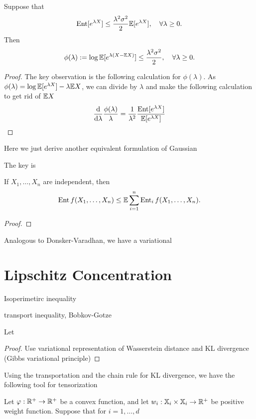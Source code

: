\begin{lemma}[Herbst]
    Suppose that 
    \begin{equation*}
        \operatorname{Ent}[e^{\lambda X}]\leq \frac{\lambda^2\sigma^2}{2}\mathbb{E}[e^{\lambda X}],\quad\forall \lambda\geq 0.
    \end{equation*}
    Then 
    \[\phi(\lambda):=\log \mathbb{E}[e^{\lambda(X-\mathbb{E} X)}]\leq \frac{\lambda^2\sigma^2}{2},\quad\forall \lambda\geq 0.\]
\end{lemma}
\begin{proof}
    The key observation is the following calculation for $\phi(\lambda)$.
    As $\phi(\lambda)=\log \mathbb{E}[e^{\lambda X}]-\lambda \mathbb{E} X$,
    we can divide by $\lambda$ and make the following calculation to get rid of $\mathbb{E} X$
    \begin{equation*}
        \frac{\mathrm{d}}{\mathrm{d}{\lambda}}\frac{\phi(\lambda)}{\lambda}=\frac{1}{\lambda^2}\frac{\operatorname{Ent}[e^{\lambda X}]}{\mathbb{E}[e^{\lambda X}]}
    \end{equation*}
\end{proof}
Here we just derive another equivalent formulation of Gaussian 

The key is 
\begin{theorem}
    If $X_1,\dots,X_n$ are independent, then
    \begin{equation*}
          \operatorname{Ent} f(X_1,\dots,X_n)\leq \mathbb{E} \sum_{i=1}^{n} \operatorname{Ent}_i f(X_1,\dots,X_n).  
    \end{equation*}
\end{theorem}
\begin{proof}
      
\end{proof}

Analogous to Donsker-Varadhan, we have a variational 

\section{Lipschitz Concentration}

Isoperimetirc inequality

transport inequality, Bobkov-Gotze
\begin{theorem}
    Let 
\end{theorem}
\begin{proof}
    Use variational representation of Wasserstein distance and KL divergence (Gibbs variational principle)
\end{proof}

Using the transportation  and the chain rule for KL divergence, we have the following tool for tensorization
\begin{theorem}[Marton]
    Let $\varphi:\mathbb{R}^+\to\mathbb{R}^+$ be a convex function, and let $w_i:\mathbb{X}_i\times\mathbb{X}_i\to\mathbb{R}^+$ be positive weight function. Suppose that for $i=1,\dots,d$
\end{theorem}

